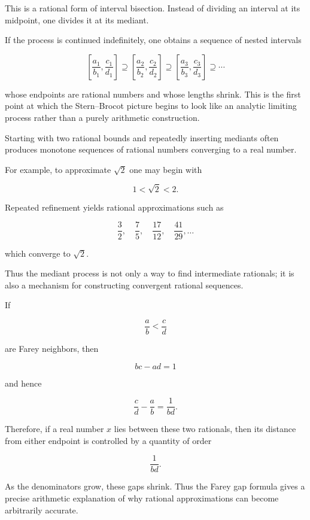 \begin{remark}
This is a rational form of interval bisection.  Instead of dividing an
interval at its midpoint, one divides it at its mediant.
\end{remark}

\begin{remark}
If the process is continued indefinitely, one obtains a sequence of
nested intervals

\[
\left[\frac{a_1}{b_1},\frac{c_1}{d_1}\right]
\supseteq
\left[\frac{a_2}{b_2},\frac{c_2}{d_2}\right]
\supseteq
\left[\frac{a_3}{b_3},\frac{c_3}{d_3}\right]
\supseteq \cdots
\]

whose endpoints are rational numbers and whose lengths shrink.
This is the first point at which the Stern--Brocot picture begins to
look like an analytic limiting process rather than a purely arithmetic
construction.
\end{remark}


\begin{remark}
Starting with two rational bounds and repeatedly inserting mediants
often produces monotone sequences of rational numbers converging to a
real number.

For example, to approximate $\sqrt{2}$ one may begin with

\[
1 < \sqrt{2} < 2.
\]

Repeated refinement yields rational approximations such as

\[
\frac{3}{2},\quad
\frac{7}{5},\quad
\frac{17}{12},\quad
\frac{41}{29},\dots
\]

which converge to $\sqrt{2}$.

Thus the mediant process is not only a way to find intermediate
rationals; it is also a mechanism for constructing convergent rational
sequences.
\end{remark}


\begin{remark}
If

\[
\frac{a}{b} < \frac{c}{d}
\]

are Farey neighbors, then

\[
bc-ad=1
\]

and hence

\[
\frac{c}{d}-\frac{a}{b}=\frac{1}{bd}.
\]

Therefore, if a real number $x$ lies between these two rationals, then
its distance from either endpoint is controlled by a quantity of order

\[
\frac{1}{bd}.
\]

As the denominators grow, these gaps shrink.  Thus the Farey gap formula
gives a precise arithmetic explanation of why rational approximations
can become arbitrarily accurate.
\end{remark}


